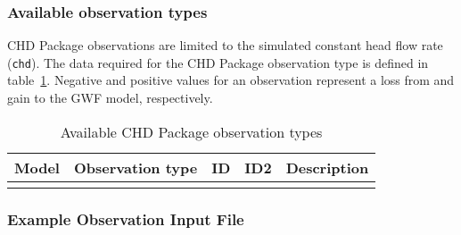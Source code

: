 \vspace{5mm}
\subsubsection{Available observation types}
CHD Package observations are limited to the simulated constant head flow rate (\texttt{chd}). The data required for the CHD Package observation type is defined in table~\ref{table:gwf-chdobstype}. Negative and positive values for an observation represent a loss from and gain to the GWF model, respectively.

\begin{longtable}{p{2cm} p{2.75cm} p{2cm} p{1.25cm} p{7cm}}
\caption{Available CHD Package observation types} \tabularnewline

\hline
\hline
\textbf{Model} & \textbf{Observation type} & \textbf{ID} & \textbf{ID2} & \textbf{Description} \\
\hline
\endhead

\hline
\endfoot


\label{table:gwf-chdobstype}
\end{longtable}

\vspace{5mm}
\subsubsection{Example Observation Input File}



